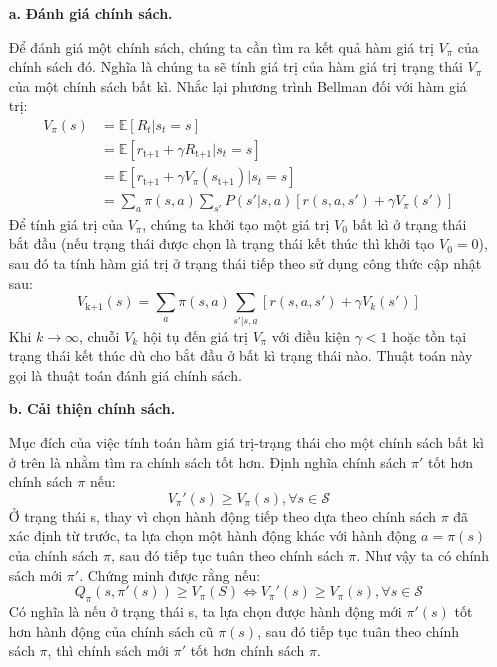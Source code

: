 \documentclass{uetgraduation}
\begin{document}
\begin{itemize}
    \item[\textbf{a.}] \textbf{Đánh giá chính sách.}
    
    Để đánh giá một chính sách, chúng ta cần tìm ra kết quả hàm giá trị $V_\pi$ của chính sách đó. Nghĩa là chúng ta sẽ tính giá trị của hàm giá trị trạng thái $V_\pi$ của một chính sách bất kì.
    Nhắc lại phương trình Bellman đối với hàm giá trị:
    \begin{align*}
        V_\pi (s) &= \mathbb{E} [R_t | s_t = s] \\
        &= \mathbb{E} [r_\text{t+1} + \gamma R_\text{t+1} | s_t = s] \\
        &= \mathbb{E} [r_\text{t+1} + \gamma V_\pi (s_\text{t+1}) | s_t = s] \\
        &= \sum_{a} \pi(s, a) \sum_{s'} P(s' | s, a) [r(s, a, s') + \gamma V_\pi (s')]
    \end{align*}
    Để tính giá trị của $V_\pi$, chúng ta khởi tạo một giá trị $V_0$ bất kì ở trạng thái bắt đầu (nếu trạng thái được chọn là trạng thái kết thúc thì khởi tạo $V_0 = 0$), sau đó ta tính hàm giá trị
    ở trạng thái tiếp theo sử dụng công thức cập nhật sau:
    \[
    V_\text{k+1} (s) = \sum_{a} \pi (s, a) \sum_{s' | s, a} [r(s, a, s') + \gamma V_k (s')]
    \]
    Khi $k \to \infty$, chuỗi $V_k$ hội tụ đến giá trị $V_\pi$ với điều kiện $\gamma < 1$ hoặc tồn tại trạng thái kết thúc dù cho bắt đầu ở bất kì trạng thái nào. Thuật toán này gọi là thuật toán đánh giá
    chính sách.

    \item[\textbf{b.}] \textbf{Cải thiện chính sách.}
    
    Mục đích của việc tính toán hàm giá trị-trạng thái cho một chính sách bất kì ở trên là nhằm tìm ra chính sách tốt hơn. Định nghĩa chính sách $\pi'$ tốt hơn chính sách $\pi$ nếu:
    \[
    V_\pi' (s) \geq V_\pi (s), \forall s \in \mathcal{S}
    \]
    Ở trạng thái s, thay vì chọn hành động tiếp theo dựa theo chính sách $\pi$ đã xác định từ trước, ta lựa chọn một hành động khác với hành động $a = \pi(s)$ của chính sách $\pi$, sau
    đó tiếp tục tuân theo chính sách $\pi$. Như vậy ta có chính sách mới $\pi'$. Chứng minh được rằng nếu:
    \[
    Q_\pi(s, \pi'(s)) \geq V_\pi (S) \iff V_\pi' (s) \geq V_\pi (s), \forall s \in \mathcal{S}
    \]
    Có nghĩa là nếu ở trạng thái s, ta lựa chọn được hành động mới $\pi'(s)$ tốt hơn hành động của chính sách cũ $\pi(s)$, sau đó tiếp tục tuân theo chính sách $\pi$, thì chính sách mới
    $\pi'$ tốt hơn chính sách $\pi$.


\end{itemize}
\end{document}
